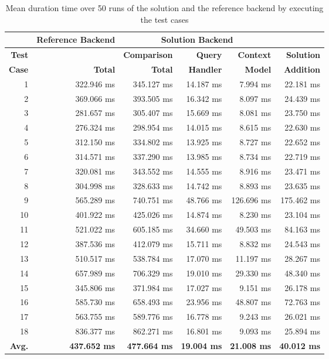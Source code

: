 \documentclass[draft,final]{vutinfth} %
\begin{document}
\begin{table}[]
	\caption{Mean duration time over 50 runs of the solution and the reference backend by executing the test cases}
	\begin{tabular}{r|r|r|r|r|r}
		
		\textbf{} & \textbf{Reference Backend} & \multicolumn{3}{c|}{\textbf{Solution Backend}} &  \\ \hline \textbf{Test} & \textbf{} & \textbf{Comparison} & \textbf{Query} & \textbf{Context} & \textbf{Solution} \\ 
		\textbf{Case} & \textbf{Total} & \textbf{Total} & \textbf{Handler} & \textbf{Model} & \textbf{Addition} \\ \hline
		1 & 322.946 ms & 345.127 ms & 14.187 ms & 7.994 ms & 22.181 ms \\ 
		2 & 369.066 ms & 393.505 ms & 16.342 ms & 8.097 ms & 24.439 ms \\ 
		3 & 281.657 ms & 305.407 ms & 15.669 ms & 8.081 ms & 23.750 ms \\ 
		4 & 276.324 ms & 298.954 ms & 14.015 ms & 8.615 ms & 22.630 ms \\ 
		5 & 312.150 ms & 334.802 ms & 13.925 ms & 8.727 ms & 22.652 ms \\ 
		6 & 314.571 ms & 337.290 ms & 13.985 ms & 8.734 ms & 22.719 ms \\ 
		7 & 320.081 ms & 343.552 ms & 14.555 ms & 8.916 ms & 23.471 ms \\ 
		8 & 304.998 ms & 328.633 ms & 14.742 ms & 8.893 ms & 23.635 ms \\ 
		9 & 565.289 ms & 740.751 ms & 48.766 ms & 126.696 ms & 175.462 ms \\ 
		10 & 401.922 ms & 425.026 ms & 14.874 ms & 8.230 ms & 23.104 ms \\ 
		11 & 521.022 ms & 605.185 ms & 34.660 ms & 49.503 ms & 84.163 ms \\ 
		12 & 387.536 ms & 412.079 ms & 15.711 ms & 8.832 ms & 24.543 ms \\ 
		13 & 510.517 ms & 538.784 ms & 17.070 ms & 11.197 ms & 28.267 ms \\ 
		14 & 657.989 ms & 706.329 ms & 19.010 ms & 29.330 ms & 48.340 ms  \\ 
		15 & 345.806 ms & 371.984 ms & 17.027 ms & 9.151 ms & 26.178 ms \\ 
		16 & 585.730 ms & 658.493 ms & 23.956 ms & 48.807 ms & 72.763 ms \\ 
		17 & 563.755 ms & 589.776 ms & 16.778 ms & 9.243 ms & 26.021 ms \\ 
		18 & 836.377 ms & 862.271 ms & 16.801 ms & 9.093 ms & 25.894 ms \\ \hline
		\textbf{Avg.} & \textbf{437.652 ms} & \textbf{477.664 ms} & \textbf{19.004 ms} & \textbf{21.008 ms} & \textbf{40.012 ms} \\ 
	\end{tabular}
	\label{Tab:eva_performance}
\end{table}
\end{document}

